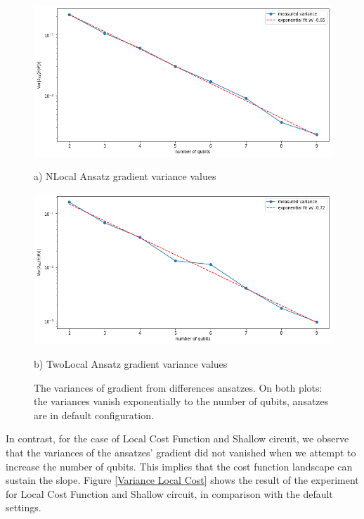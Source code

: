 \begin{figure}
    \includegraphics[width=\textwidth]{Artefact/Appendices/NLocalDefault.png}
    \centerline{a) NLocal Ansatz gradient variance values}
    \includegraphics[width=\textwidth]{Artefact/Appendices/TwoLocalDefault.png}
    \centerline{b) TwoLocal Ansatz gradient variance values}
    \caption{
        The variances of gradient from differences ansatzes.
        On both plots: the variances vanish exponentially to the number of qubits, ansatzes are in default configuration.
    }
    \label{Plot ansatzes gradients default}
\end{figure}

In contrast, for the case of Local Cost Function and Shallow circuit, we observe that the variances of the ansatzes' gradient did not vanished when we attempt to increase the number of qubits.
This implies that the cost function landscape can sustain the slope.
Figure \ref{Variance Local Cost} shows the result of the experiment for Local Cost Function and Shallow circuit, in comparison with the default settings.

